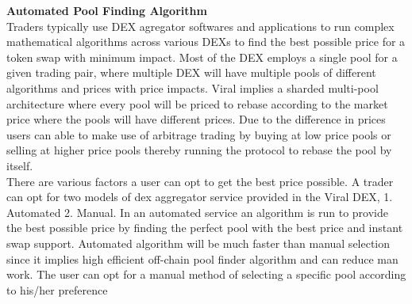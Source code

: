 \documentclass[conference]{IEEEtran}
\begin{document}
\textbf{Automated Pool Finding Algorithm}\\

Traders typically use DEX agregator softwares and applications to run complex mathematical algorithms across various DEXs to find the best possible price for a token swap with minimum impact. Most of the DEX employs a single pool for a given trading pair, where multiple DEX will have multiple pools of different algorithms and prices with price impacts. Viral implies a sharded multi-pool architecture where every pool will be priced to rebase according to the market price where the pools will have different prices. Due to the difference in prices users can able to make use of arbitrage trading by buying at low price pools or selling at higher price pools thereby running the protocol to rebase the pool by itself. \\

There are various factors a user can opt to get the best price possible. A trader can opt for two models of dex aggregator service provided in the Viral DEX, 1. Automated 2. Manual. In an automated service an algorithm is run to provide the best possible price by finding the perfect pool with the best price and instant swap support. Automated algorithm will be much faster than manual selection since it implies high efficient off-chain pool finder algorithm and can reduce man work. The user can opt for a manual method of selecting a specific pool according to his/her preference\\
\end{document}

